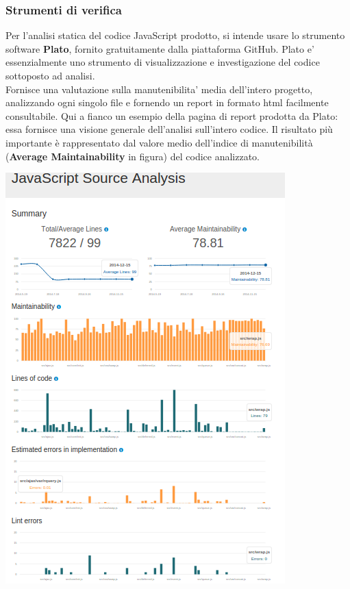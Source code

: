 \documentclass[a4paper,11pt]{article}
\begin{document}
		\subsubsection{Strumenti di verifica}
\begin{fixpic}
\begin{minipage}[t]{0.50\linewidth} %
\vspace{0pt} %

Per l'analisi statica del codice JavaScript prodotto, si intende usare lo strumento software \textbf{Plato\addglos}, fornito gratuitamente dalla piattaforma GitHub.
Plato e' essenzialmente uno strumento di visualizzazione e investigazione del codice sottoposto ad analisi.\\
Fornisce una valutazione sulla manutenibilita' media dell'intero progetto, analizzando ogni singolo file e fornendo un report in formato html facilmente consultabile.
Qui a fianco un esempio della pagina di report prodotta da Plato: essa fornisce una visione generale dell'analisi sull'intero codice.
Il risultato più importante è rappresentato dal valore medio dell'indice di manutenibilità (\textbf{Average Maintainability} in figura) del codice analizzato. \\
\end{minipage}
\hspace{0.5cm}
\begin{minipage}[t]{0.45\linewidth}
\vspace{0pt} %
  \centering
  \includegraphics[width=\textwidth]{images/plato.png}

\end{minipage}
\end{fixpic}
\end{document}

